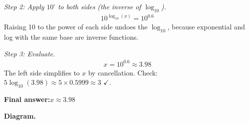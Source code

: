 \documentclass[11pt]{article}
\begin{document}
\textit{Step 2: Apply \( 10^{\square} \) to both sides (the inverse of \( \log_{10} \)).}
\[\begin{gathered}
10^{\log_{10}(x)} = 10^{0.6}
\end{gathered}\]
Raising 10 to the power of each side undoes the \( \log_{10} \), because exponential and log with the same base are inverse functions.

\textit{Step 3: Evaluate.}
\[\begin{gathered}
x = 10^{0.6} \approx 3.98
\end{gathered}\]
The left side simplifies to \( x \) by cancellation. Check: \( 5\log_{10}(3.98) \approx 5 \times 0.5999 \approx 3 \) $\checkmark$.

\begin{answerbox}
\textbf{Final answer:}\quad \(\displaystyle  x \approx 3.98 \)
\end{answerbox}
\textbf{Diagram.}
\end{document}
